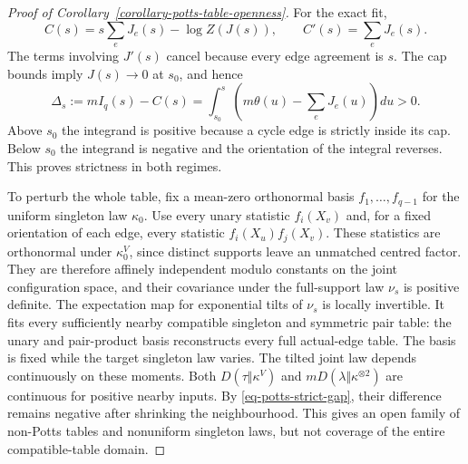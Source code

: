 \documentclass[a4paper,11pt,reqno]{amsart}
\theoremstyle{plain}
\theoremstyle{definition}
\theoremstyle{remark}
\begin{document}
\begin{proof}[Proof of Corollary~\ref{corollary-potts-table-openness}]
For the exact fit,
\[
 C(s)=s\sum_eJ_e(s)-\log Z(J(s)),\qquad C'(s)=\sum_eJ_e(s).
\]
The terms involving $J'(s)$ cancel because every edge agreement is $s$.
The cap bounds imply $J(s)\to0$ at $s_0$, and hence
\begin{equation}\label{eq-potts-strict-gap}
 \Delta_s:=mI_q(s)-C(s)
 =\int_{s_0}^{s}\left(m\theta(u)-\sum_eJ_e(u)\right)du>0.
\end{equation}
Above $s_0$ the integrand is positive because a cycle edge is strictly
inside its cap.  Below $s_0$ the integrand is negative and the orientation
of the integral reverses.  This proves strictness in both regimes.

To perturb the whole table, fix a mean-zero orthonormal basis
$f_1,\ldots,f_{q-1}$ for the uniform singleton law $\kappa_0$.
Use every unary statistic $f_i(X_v)$ and, for a fixed orientation of each
edge, every statistic $f_i(X_u)f_j(X_v)$.
These statistics are orthonormal under $\kappa_0^V$, since distinct
supports leave an unmatched centred factor.  They are therefore affinely
independent modulo constants on the joint configuration space, and their
covariance under the full-support law $\nu_s$ is positive definite.
The expectation map for exponential tilts of $\nu_s$ is locally invertible.
It fits every sufficiently nearby compatible singleton and symmetric pair
table: the unary and pair-product basis reconstructs every full actual-edge
table.  The basis is fixed while the target singleton law varies.
The tilted joint law depends continuously on these moments.  Both
$D(\tau\Vert\kappa^V)$ and $mD(\lambda\Vert\kappa^{\otimes2})$ are
continuous for positive nearby inputs.  By \eqref{eq-potts-strict-gap},
their difference remains negative after shrinking the neighbourhood.
This gives an open family of non-Potts tables and nonuniform singleton laws,
but not coverage of the entire compatible-table domain.


\end{proof}
\end{document}
